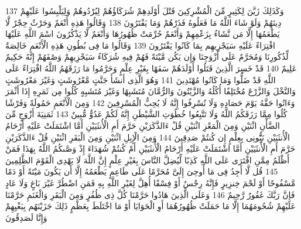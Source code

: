 \documentclass[20pt,a4paper]{article}
\begin{document}
{\tiny\colorbox{cl_aya}{137}} وَكَذَلِكَ زَيَّنَ لِكَثِيرٍ مِّنَ الْمُشْرِكِينَ قَتْلَ أَوْلَدِهِمْ شُرَكَاؤُهُمْ لِيُرْدُوهُمْ وَلِيَلْبِسُوا عَلَيْهِمْ دِينَهُمْ وَلَوْ شَاءَ اللَّهُ مَا فَعَلُوهُ فَذَرْهُمْ وَمَا يَفْتَرُونَ
{\tiny\colorbox{cl_aya}{138}} وَقَالُوا هَذِهِ أَنْعَمٌ وَحَرْثٌ حِجْرٌ لَّا يَطْعَمُهَا إِلَّا مَن نَّشَاءُ بِزَعْمِهِمْ وَأَنْعَمٌ حُرِّمَتْ ظُهُورُهَا وَأَنْعَمٌ لَّا يَذْكُرُونَ اسْمَ اللَّهِ عَلَيْهَا افْتِرَاءً عَلَيْهِ سَيَجْزِيهِم بِمَا كَانُوا يَفْتَرُونَ
{\tiny\colorbox{cl_aya}{139}} وَقَالُوا مَا فِى بُطُونِ هَذِهِ الْأَنْعَمِ خَالِصَةٌ لِّذُكُورِنَا وَمُحَرَّمٌ عَلَى أَزْوَجِنَا وَإِن يَكُن مَّيْتَةً فَهُمْ فِيهِ شُرَكَاءُ سَيَجْزِيهِمْ وَصْفَهُمْ إِنَّهُ حَكِيمٌ عَلِيمٌ
{\tiny\colorbox{cl_aya}{140}} قَدْ خَسِرَ الَّذِينَ قَتَلُوا أَوْلَدَهُمْ سَفَهًا بِغَيْرِ عِلْمٍ وَحَرَّمُوا مَا رَزَقَهُمُ اللَّهُ افْتِرَاءً عَلَى اللَّهِ قَدْ ضَلُّوا وَمَا كَانُوا مُهْتَدِينَ
{\tiny\colorbox{cl_aya}{141}} وَهُوَ الَّذِى أَنشَأَ جَنَّتٍ مَّعْرُوشَتٍ وَغَيْرَ مَعْرُوشَتٍ وَالنَّخْلَ وَالزَّرْعَ مُخْتَلِفًا أُكُلُهُ وَالزَّيْتُونَ وَالرُّمَّانَ مُتَشَبِهًا وَغَيْرَ مُتَشَبِهٍ كُلُوا مِن ثَمَرِهِ إِذَا أَثْمَرَ وَءَاتُوا حَقَّهُ يَوْمَ حَصَادِهِ وَلَا تُسْرِفُوا إِنَّهُ لَا يُحِبُّ الْمُسْرِفِينَ
{\tiny\colorbox{cl_aya}{142}} وَمِنَ الْأَنْعَمِ حَمُولَةً وَفَرْشًا كُلُوا مِمَّا رَزَقَكُمُ اللَّهُ وَلَا تَتَّبِعُوا خُطُوَتِ الشَّيْطَنِ إِنَّهُ لَكُمْ عَدُوٌّ مُّبِينٌ
{\tiny\colorbox{cl_aya}{143}} ثَمَنِيَةَ أَزْوَجٍ مِّنَ الضَّأْنِ اثْنَيْنِ وَمِنَ الْمَعْزِ اثْنَيْنِ قُلْ ءَالذَّكَرَيْنِ حَرَّمَ أَمِ الْأُنثَيَيْنِ أَمَّا اشْتَمَلَتْ عَلَيْهِ أَرْحَامُ الْأُنثَيَيْنِ نَبُِّٔونِى بِعِلْمٍ إِن كُنتُمْ صَدِقِينَ
{\tiny\colorbox{cl_aya}{144}} وَمِنَ الْإِبِلِ اثْنَيْنِ وَمِنَ الْبَقَرِ اثْنَيْنِ قُلْ ءَالذَّكَرَيْنِ حَرَّمَ أَمِ الْأُنثَيَيْنِ أَمَّا اشْتَمَلَتْ عَلَيْهِ أَرْحَامُ الْأُنثَيَيْنِ أَمْ كُنتُمْ شُهَدَاءَ إِذْ وَصَّىكُمُ اللَّهُ بِهَذَا فَمَنْ أَظْلَمُ مِمَّنِ افْتَرَى عَلَى اللَّهِ كَذِبًا لِّيُضِلَّ النَّاسَ بِغَيْرِ عِلْمٍ إِنَّ اللَّهَ لَا يَهْدِى الْقَوْمَ الظَّلِمِينَ
{\tiny\colorbox{cl_aya}{145}} قُل لَّا أَجِدُ فِى مَا أُوحِىَ إِلَىَّ مُحَرَّمًا عَلَى طَاعِمٍ يَطْعَمُهُ إِلَّا أَن يَكُونَ مَيْتَةً أَوْ دَمًا مَّسْفُوحًا أَوْ لَحْمَ خِنزِيرٍ فَإِنَّهُ رِجْسٌ أَوْ فِسْقًا أُهِلَّ لِغَيْرِ اللَّهِ بِهِ فَمَنِ اضْطُرَّ غَيْرَ بَاغٍ وَلَا عَادٍ فَإِنَّ رَبَّكَ غَفُورٌ رَّحِيمٌ
{\tiny\colorbox{cl_aya}{146}} وَعَلَى الَّذِينَ هَادُوا حَرَّمْنَا كُلَّ ذِى ظُفُرٍ وَمِنَ الْبَقَرِ وَالْغَنَمِ حَرَّمْنَا عَلَيْهِمْ شُحُومَهُمَا إِلَّا مَا حَمَلَتْ ظُهُورُهُمَا أَوِ الْحَوَايَا أَوْ مَا اخْتَلَطَ بِعَظْمٍ ذَلِكَ جَزَيْنَهُم بِبَغْيِهِمْ وَإِنَّا لَصَدِقُونَ
\end{document}
